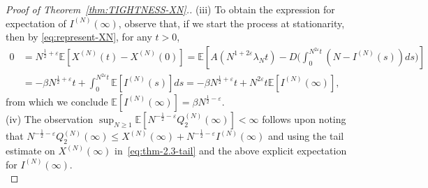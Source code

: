 \documentclass[11pt, reqno]{article}
\numberwithin{equation}{section}
\numberwithin{theorem}{section}
\newcommand{\E}{\mathbb{E}}                 %
\begin{document}
\begin{proof}[Proof of Theorem~\ref{thm:TIGHTNESS-XN}.]
(iii) To obtain the expression for expectation of $I^{(N)}(\infty)$, observe that, if we start the process at stationarity, then by \eqref{eq:represent-XN}, for any $t > 0$,
\begin{align*}
0&= N^{\frac{1}{2} + \varepsilon}\E[X^{(N)}(t) - X^{(N)}(0)] =  \E\left[A(N^{1+2\varepsilon}\lambda_Nt) - D\Big(\int_0^{N^{2\varepsilon}t}(N-I^{(N)}(s))ds\Big)\right]\\
&= -\beta N^{\frac{1}{2}+\varepsilon} t + \int_0^{N^{2\varepsilon}t}\E[I^{(N)}(s)]ds = -\beta N^{\frac{1}{2}+\varepsilon} t + N^{2\varepsilon}t \E[I^{(N)}(\infty)],
\end{align*}
from which we conclude $\E\left[I^{(N)}(\infty)\right] = \beta N^{\frac{1}{2}-\varepsilon}$.\\

(iv) The observation $\sup_{N \ge 1}\E\left[N^{-\frac{1}{2}-\varepsilon}Q^{(N)}_2(\infty)\right] < \infty$ follows upon noting that $N^{-\frac{1}{2}-\varepsilon}Q^{(N)}_2(\infty) \le X^{(N)}(\infty) + N^{-\frac{1}{2} - \varepsilon}I^{(N)}(\infty)$ and using the tail estimate on $X^{(N)}(\infty)$ in~\eqref{eq:thm-2.3-tail} and the above explicit expectation for $I^{(N)}(\infty)$.\\


\end{proof}
\end{document}

